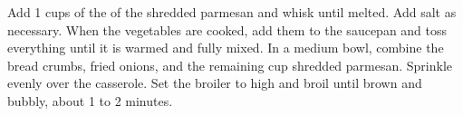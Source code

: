 \begin{recipe}
{	\step Add 1  cups of the of the shredded parmesan and whisk until melted. Add salt as necessary.
	\step When the vegetables are cooked, add them to the saucepan and toss everything until it is warmed and fully mixed.
	\step In a medium bowl, combine the bread crumbs, fried onions, and the remaining  cup shredded parmesan. Sprinkle evenly over the casserole.
	\step Set the broiler to high and broil until brown and bubbly, about 1 to 2 minutes.
}
\end{recipe}\label{rec:GBCasserole}
